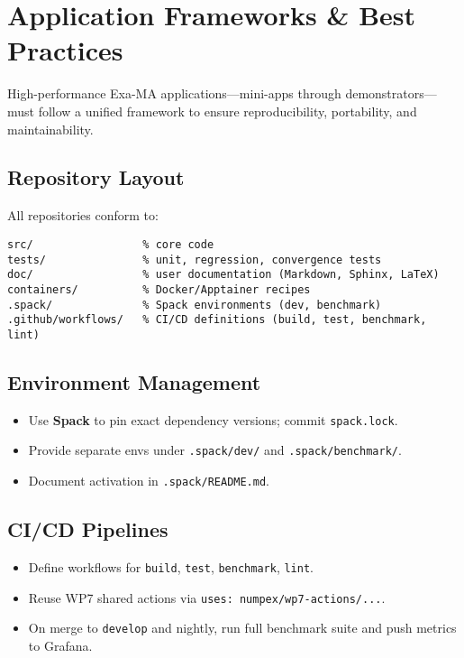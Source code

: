 
\section{Application Frameworks \& Best Practices}
\label{sec:apps-framework}

High-performance Exa-MA applications—mini-apps through demonstrators—must follow a unified framework to ensure reproducibility, portability, and maintainability.

\subsection{Repository Layout}
All repositories conform to:
\begin{verbatim}
src/                 % core code
tests/               % unit, regression, convergence tests
doc/                 % user documentation (Markdown, Sphinx, LaTeX)
containers/          % Docker/Apptainer recipes
.spack/              % Spack environments (dev, benchmark)
.github/workflows/   % CI/CD definitions (build, test, benchmark, lint)
\end{verbatim}

\subsection{Environment Management}
\begin{itemize}
  \item Use \textbf{Spack} to pin exact dependency versions; commit \texttt{spack.lock}.  
  \item Provide separate envs under \texttt{.spack/dev/} and \texttt{.spack/benchmark/}.  
  \item Document activation in \texttt{.spack/README.md}.
\end{itemize}

\subsection{CI/CD Pipelines}
\begin{itemize}
  \item Define workflows for \texttt{build}, \texttt{test}, \texttt{benchmark}, \texttt{lint}.  
  \item Reuse WP7 shared actions via \texttt{uses: numpex/wp7-actions/...}.  
  \item On merge to \texttt{develop} and nightly, run full benchmark suite and push metrics to Grafana.
\end{itemize}

